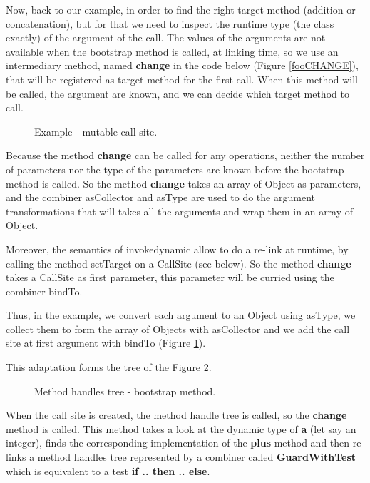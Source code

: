 \documentclass{sig-alternate}
\begin{document}
      Now, back to our example, in order to find the right target method (addition or concatenation),
      but for that we need to inspect the runtime type (the class exactly) of the argument of the call.
      The values of the arguments are not available when the bootstrap method is called, at linking time,
      so we use an intermediary method, named {\bf change} in the code below (Figure \ref{fooCHANGE}),
      that will be registered as target method for the first call.
      When this method will be called, the argument are known, and we can decide which target method to call.

      \begin{figure}[!h]
        \centering \vspace{-1.5em}
        \caption{Example - mutable call site.}\vspace{-.25em}
        \label{fooMCS}
      \end{figure}

      Because the method {\bf change} can be called for any operations, neither the number of parameters nor the type
      of the parameters are known before the bootstrap method is called. So the method {\bf change} takes an array of
      Object as parameters, and the combiner asCollector and asType are used to do the argument transformations
      that will takes all the arguments and wrap them in an array of Object.

      Moreover, the semantics of invokedynamic allow to do a re-link at runtime, by calling the method setTarget
      on a CallSite (see below). So the method {\bf change} takes a CallSite as first parameter, this parameter
      will be curried using the combiner bindTo.
       
      Thus, in the example, we convert each argument to an Object using asType,
      we collect them to form the array of Objects with asCollector and
      we add the call site at first argument with bindTo (Figure \ref{fooMCS}).

      \noindent This adaptation forms the tree of the Figure \ref{ast1}.

      \begin{figure}[!h]
        \centering \resizebox{.7\linewidth}{!}{}
        \caption{Method handles tree - bootstrap method.}\vspace{-1em}
        \label{ast1}
      \end{figure}

      When the call site is created, the method handle tree is called, so the {\bf change} method is called.
      This method takes a look at the dynamic type of {\bf a} (let say an integer),
      finds the corresponding implementation of the {\bf plus} method
      and then re-links a method handles tree represented by a combiner called {\bf GuardWithTest}
      which is equivalent to a test {\bf if .. then .. else}.
\end{document}
